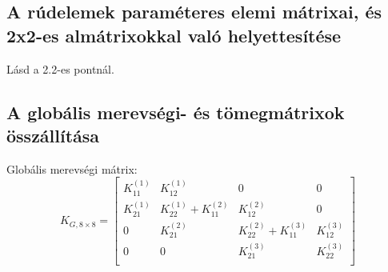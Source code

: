 \documentclass{article}
\begin{document}
			\begin{figure}[h!]		
				\begin{center}
				\end{center}	
			\caption{}
			\end{figure}
	
		\subsection{A rúdelemek paraméteres elemi mátrixai, és 2x2-es almátrixokkal való helyettesítése}
		
			Lásd a 2.2-es pontnál.
		
		\subsection{A globális merevségi- és tömegmátrixok összállítása}
		
			Globális merevségi mátrix:
			\begin{equation}
				K_{G,8\times8}=
				\begin{bmatrix}
					K_{11}^{(1)} & K_{12}^{(1)}              & 0            			    & 0            \\
					K_{21}^{(1)} & K_{22}^{(1)}+K_{11}^{(2)} & K_{12}^{(2)}  			    & 0            \\
					0            & K_{21}^{(2)}              & K_{22}^{(2)} + K_{11}^{(3)}  & K_{12}^{(3)} \\
					0            & 0						 & K_{21}^{(3)} 					& K_{22}^{(3)} \\
				\end{bmatrix}
			\end{equation}
		
\end{document}
